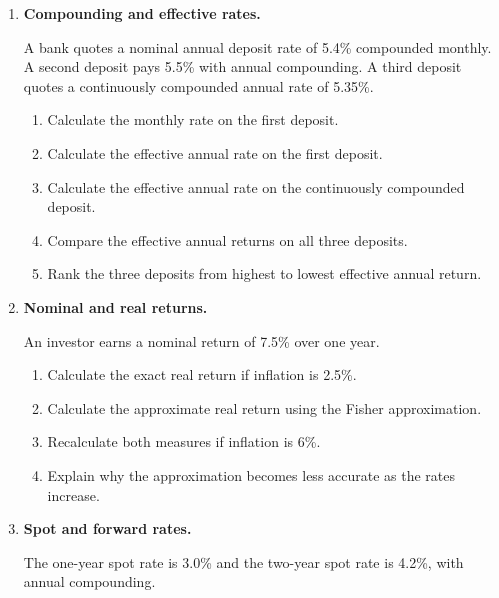 \begin{enumerate}

\item \textbf{Compounding and effective rates.}

A bank quotes a nominal annual deposit rate of 5.4\% compounded monthly. A second deposit pays 5.5\% with annual compounding. A third deposit quotes a continuously compounded annual rate of 5.35\%.

\begin{enumerate}

\item Calculate the monthly rate on the first deposit.

\item Calculate the effective annual rate on the first deposit.

\item Calculate the effective annual rate on the continuously compounded deposit.

\item Compare the effective annual returns on all three deposits.

\item Rank the three deposits from highest to lowest effective annual return.

\end{enumerate}


\item \textbf{Nominal and real returns.}

An investor earns a nominal return of 7.5\% over one year.

\begin{enumerate}

\item Calculate the exact real return if inflation is 2.5\%.

\item Calculate the approximate real return using the Fisher approximation.

\item Recalculate both measures if inflation is 6\%.

\item Explain why the approximation becomes less accurate as the rates increase.

\end{enumerate}


\item \textbf{Spot and forward rates.}

The one-year spot rate is 3.0\% and the two-year spot rate is 4.2\%, with annual compounding.


\end{enumerate}
